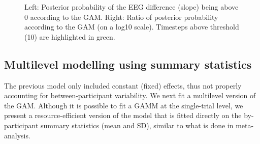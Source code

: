 \documentclass[
  doc,
  floatsintext,
  longtable,
  a4paper,
  nolmodern,
  notxfonts,
  notimes,
  colorlinks=true,linkcolor=blue,citecolor=blue,urlcolor=blue]{apa7}
\begin{document}
\begin{figure}[!htb]

\caption{\label{fig-post-prob-ratio}Left: Posterior probability of the
EEG difference (slope) being above 0 according to the GAM. Right: Ratio
of posterior probability according to the GAM (on a log10 scale).
Timesteps above threshold (10) are highlighted in green.}


\end{figure}%

\newpage

\subsection{Multilevel modelling using summary
statistics}\label{multilevel-modelling-using-summary-statistics}

The previous model only included constant (fixed) effects, thus not
properly accounting for between-participant variability. We next fit a
multilevel version of the GAM. Although it is possible to fit a GAMM at
the single-trial level, we present a resource-efficient version of the
model that is fitted directly on the by-participant summary statistics
(mean and SD), similar to what is done in meta-analysis.
\end{document}

